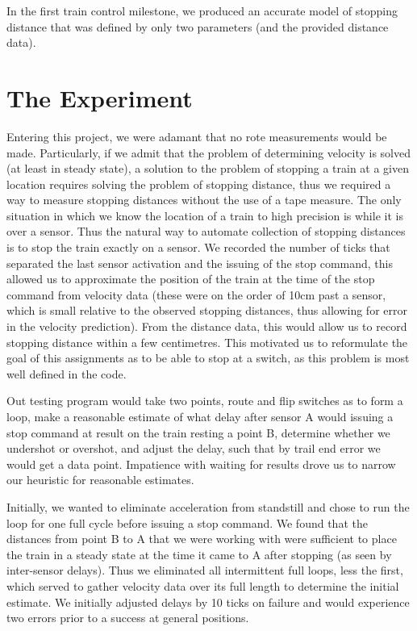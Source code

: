\documentclass{amsart} \usepackage{amsmath} \usepackage{upgreek}
\begin{document}
In the first train control milestone, we produced an accurate model of stopping distance that was defined by only two parameters (and the provided distance data).

\section*{The Experiment}


Entering this project, we were adamant that no rote measurements would be made. Particularly, if we admit that the problem of determining velocity is solved (at least in steady state), a solution to the problem of stopping a train at a given location requires solving the problem of stopping distance, thus we required a way to measure stopping distances without the use of a tape measure. The only situation in which we know the location of a train to high precision is while it is over a sensor. Thus the natural way to automate collection of stopping distances is to stop the train exactly on a sensor. We recorded the number of ticks that separated the last sensor activation and the issuing of the stop command, this allowed us to approximate the position of the train at the time of the stop command from velocity data (these were on the order of 10cm past a sensor, which is small relative to the observed stopping distances, thus allowing for error in the velocity prediction). From the distance data, this would allow us to record stopping distance within a few centimetres. This motivated us to reformulate the goal of this assignments as to be able to stop at a switch, as this problem is most well defined in the code.

Out testing program would take two points, route and flip switches as to form a loop, make a reasonable estimate of what delay after sensor A would issuing a stop command at result on the train resting a point B, determine whether we undershot or overshot, and adjust the delay, such that by trail end error we would get a data point. Impatience with waiting for results drove us to narrow our heuristic for reasonable estimates.

Initially, we wanted to eliminate acceleration from standstill and chose to run the loop for one full cycle before issuing a stop command. We found that the distances from point B to A that we were working with were sufficient to place the train in a steady state at the time it came to A after stopping (as seen by inter-sensor delays). Thus we eliminated all intermittent full loops, less the first, which served to gather velocity data over its full length to determine the initial estimate. We initially adjusted delays by 10 ticks on failure and would experience two errors prior to a success at general positions.
\end{document}
